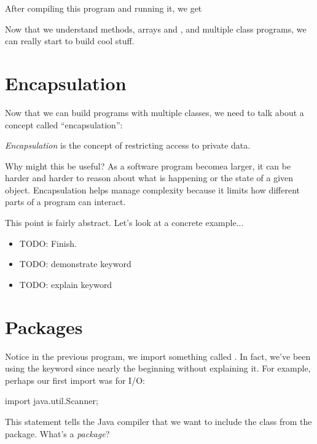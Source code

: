After compiling this program and running it, we get


Now that we understand methods, arrays and , and multiple class programs, we can really start to build cool stuff.

\section{Encapsulation}

Now that we can build programs with multiple classes, we need to talk about a concept called ``encapsulation'':

\begin{definition}
\emph{Encapsulation} is the concept of restricting access to private data.
\end{definition}

Why might this be useful? As a software program becomea larger, it can be harder and harder to reason about what is happening or the state of a given object. Encapsulation helps manage complexity because it limits how different parts of a program can interact.

This point is fairly abstract. Let's look at a concrete example...

\begin{itemize}
    \item TODO: Finish.
    \item TODO: demonstrate  keyword
    \item TODO: explain  keyword
\end{itemize}

\section{Packages}

Notice in the previous  program, we import something called . In fact, we've been using the  keyword since nearly the beginning without explaining it. For example, perhaps our first import was for I/O:

\begin{code}
import java.util.Scanner;
\end{code}

This  statement tells the Java compiler that we want to include the  class from the  package. What's a \emph{package}?

